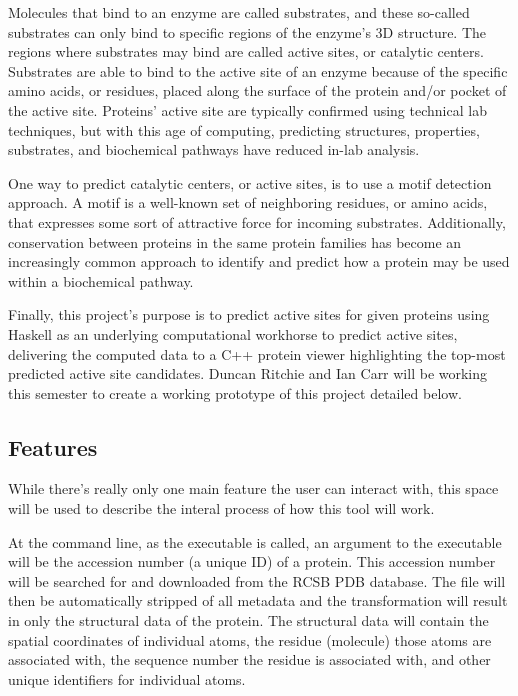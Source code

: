\documentclass[12pt]{article}
\begin{document}
		Molecules that bind to an enzyme are called substrates, and these
		so-called substrates can only bind to specific regions of the enzyme's
		3D structure. The regions where substrates may bind are called active
		sites, or catalytic centers. Substrates are able to bind to the active
		site of an enzyme because of the specific amino acids, or residues,
		placed along the surface of the protein and/or pocket of the active site.
		Proteins' active site are typically confirmed using technical lab
		techniques, but with this age of computing, predicting structures,
		properties, substrates, and biochemical pathways have reduced in-lab
		analysis. 

		One way to predict catalytic centers, or active sites, is to use a 
		motif detection approach. A motif is a well-known set of neighboring
		residues, or amino acids, that expresses some sort of attractive force
		for incoming substrates. Additionally, conservation between proteins
		in the same protein families has become an increasingly common approach
		to identify and predict how a protein may be used within a biochemical
		pathway.

		Finally, this project's purpose is to predict active sites for given
		proteins using Haskell as an underlying computational workhorse to 
		predict active sites, delivering the computed data to a C++ protein viewer
		highlighting the top-most predicted active site candidates. Duncan 
		Ritchie and Ian Carr will be working this semester to create a working
		prototype of this project detailed below.

		\subsection*{Features}

		While there's really only one main feature the user can interact with,
		this space will be used to describe the interal process of how this
		tool will work.

		At the command line, as the executable is called, an argument to the
		executable will be the accession number (a unique ID) of a protein.
		This accession number will be searched for and downloaded from the 
		RCSB PDB database. The file will then be automatically stripped of 
		all metadata and the transformation will result in only the structural
		data of the protein. The structural data will contain the spatial
		coordinates of individual atoms, the residue (molecule) those atoms
		are associated with, the sequence number the residue is associated with,
		and other unique identifiers for individual atoms.
\end{document}
